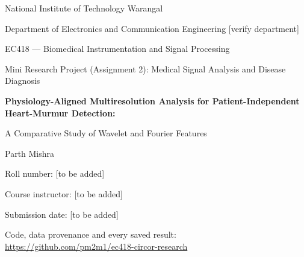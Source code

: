 \documentclass[11pt,a4paper]{article}
\newcommand{\todo}[1]{{\color{gray}[#1]}}
\begin{document}
\begin{titlepage}
\centering
{\large National Institute of Technology Warangal\par}
{\normalsize Department of Electronics and Communication Engineering \todo{verify department}\par}
\vspace{1.5cm}
{\large EC418 — Biomedical Instrumentation and Signal Processing\par}
{\normalsize Mini Research Project (Assignment 2): Medical Signal Analysis and Disease Diagnosis\par}
\vspace{2cm}
{\LARGE\bfseries Physiology-Aligned Multiresolution Analysis for Patient-Independent Heart-Murmur Detection:\par}
\vspace{0.3cm}
{\Large A Comparative Study of Wavelet and Fourier Features\par}
\vspace{2cm}
{\large Parth Mishra\par}
{\normalsize Roll number: \todo{to be added}\par}
\vspace{0.8cm}
{\normalsize Course instructor: \todo{to be added}\par}
\vfill
{\normalsize Submission date: \todo{to be added}\par}
\vspace{0.5cm}
{\small Code, data provenance and every saved result: \url{https://github.com/pm2m1/ec418-circor-research}\par}
\end{titlepage}

\begin{abstract}
\noindent We study patient-independent detection of heart murmurs from phonocardiograms (PCG) on the public PhysioNet
CirCor DigiScope dataset, comparing wavelet-packet (WPD), short-time Fourier (STFT) and wavelet-scattering features under
cardiac-cycle-aligned and whole-signal designs, with WEKA classifiers on frozen subject-grouped folds (874 patients) and
hypotheses registered before each analysis. Three findings stand out. (i) Cardiac-cycle timing carries the information:
with the same features, destroying the alignment to the expert S1/systole/S2/diastole labels lowers patient AUROC by
 (all 25 folds). (ii) The transform does not matter: wavelet packets were never better than matched
STFT bands (differences ), equivalence was not shown, and wavelet scattering did not beat STFT bands.
(iii) A whole-signal STFT model trained on CirCor reaches AUROC  for congenital heart disease (CHD) on the
independent ZCHSound cohort, with the physiological subtype order. An automatic pipeline with a learned span detector
comes within the pre-registered $-0.03$ of expert labels on the point estimate, but statistical non-inferiority is not
established, and its advantage over a whole-signal baseline that is given the same span information is not established
either (). Negative results, errata and post-hoc analyses are reported as such; nothing here
supports clinical deployment.
\end{abstract}
\newpage
\tableofcontents
\newpage
\end{document}
